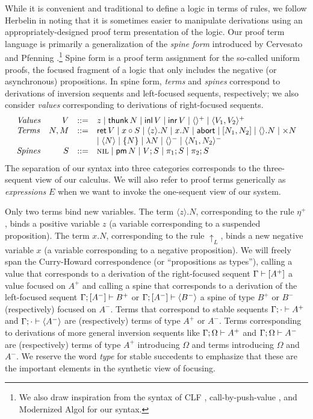 \documentclass[acmtocl]{robtrans}\pdfoutput=1
\newcommand{\susp}[1]{\langle{#1}\rangle}
\newcommand{\rfoc}[2]{{#1} \vdash [{#2}] \mathstrut}
\newcommand{\lfoc}[3]{{#1}; [{#2}] \vdash {#3} \mathstrut}
\newcommand{\ifoc}[3]{{#1}; {#2} \vdash {#3} \mathstrut}
\newcommand{\dsrt}[1]{\mathsf{thunk}\,{#1}}
\newcommand{\dslt}[2]{{#1}.{#2}}      \newcommand{\usrt}[1]{\{{#1}\}}       \newcommand{\uslt}[1]{\mathsf{pm}\,{#1}}
\newcommand{\etart}[1]{\langle{#1}\rangle} \newcommand{\etalt}[2]{\susp{#1}.{#2}}
\newcommand{\rft}[1]{\mathsf{ret}\,{#1}} \newcommand{\lft}[2]{{#1} \circ {#2}}
\begin{document}
While it is convenient and traditional to define a logic in terms of
rules, we follow Herbelin  in noting that it is 
sometimes 
easier to manipulate derivations using an appropriately-designed proof term
presentation of the logic. 
Our proof term language is primarily a
generalization of the {\it spine form} introduced by Cervesato and
Pfenning .\footnote{We also draw
  inspiration from the syntax of CLF \cite{watkins02concurrent},
  call-by-push-value \cite{levy04call}, and Modernized Algol
  \cite{harper12practical} for our syntax.}  Spine form is a proof
term assignment for the so-called uniform proofs, the focused fragment
of a logic that only includes the negative (or asynchronous)
propositions. In spine form, {\it terms} and {\it spines} correspond
to derivations of inversion sequents and left-focused sequents,
respectively; we also consider {\it values} corresponding to
derivations of right-focused sequents.
\[
\begin{array}{lrcl}
\mbox{\it Values}
 & V & ::= 
 & z \mid \dsrt{N} 
   \mid \mathsf{inl}\,V \mid \mathsf{inr}\,V
   \mid \langle\rangle^+ \mid \langle V_1, V_2 \rangle^+
\\
\mbox{\it Terms}
 & N, M & ::=
 & \rft{V} \mid \lft{x}{S}
   \mid \etalt{z}{N} \mid \dslt{x}{N}
   \mid \mathsf{abort} \mid [N_1, N_2]
   \mid \langle\rangle.N \mid \times N
\\ & & & 
   \mid \etart{N} \mid \usrt{N} \mid \lambda N
   \mid \langle\rangle^- \mid \langle N_1, N_2 \rangle^-
\\
\mbox{\it Spines}
 & S & ::=
 & \textsc{nil} \mid \uslt{N} \mid V; S \mid \pi_1; S \mid \pi_2; S
\end{array}
\]
The separation of our syntax into three categories corresponds to the
three-sequent view of our calculus. We will also refer to proof terms
generically as {\it expressions} $E$ when we want to invoke the
one-sequent view of our system.

Only two terms bind new variables. The term $\etalt{z}{N}$,
corresponding to the rule $\eta^+$, binds a positive variable $z$ (a
variable corresponding to a suspended proposition). The term
$\dslt{x}{N}$, corresponding to the rule ${\uparrow}_L$, binds a new
negative variable $x$ (a variable corresponding to a negative
proposition).  We will freely span the Curry-Howard correspondence (or
``propositions as types''), calling a value that corresponds to a
derivation of the right-focused sequent $\rfoc{\Gamma}{A^+}$ a value
focused on $A^+$ and calling a spine that corresponds to a derivation
of the left-focused sequent $\lfoc{\Gamma}{A^-}{B^+}$ or
$\lfoc{\Gamma}{A^-}{\susp{B^-}}$ a spine of type $B^+$ or $B^-$
(respectively) focused on $A^-$. Terms that correspond to stable
sequents $\ifoc{\Gamma}{\cdot}{A^+}$ and
$\ifoc{\Gamma}{\cdot}{\susp{A^-}}$ are (respectively) terms of type
$A^+$ or $A^-$.  Terms corresponding to derivations of more general
inversion sequents like $\ifoc{\Gamma}{\Omega}{A^+}$ and
$\ifoc{\Gamma}{\Omega}{A^-}$ are (respectively) terms of type $A^+$
introducing $\Omega$ and terms introducing $\Omega$ and $A^-$. We
reserve the word {\it type} for stable succedents to emphasize that
these are the important elements in the synthetic view of focusing.
\end{document}
